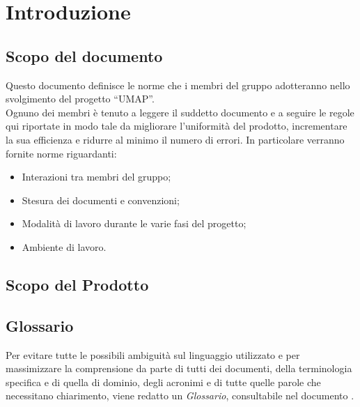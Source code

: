 \section{Introduzione}

\subsection{Scopo del documento}

Questo documento definisce le norme che i membri del gruppo \GroupName{} adotteranno nello svolgimento del progetto “UMAP”. \\

Ognuno dei membri è tenuto a leggere il suddetto documento e a seguire le regole qui riportate in modo tale da migliorare l'uniformità del prodotto, incrementare la sua efficienza e ridurre al minimo il numero di errori. In particolare verranno fornite norme riguardanti:
\begin{itemize}
\item Interazioni tra membri del gruppo;
\item Stesura dei documenti e convenzioni;
\item Modalità di lavoro durante le varie fasi del progetto;
\item Ambiente di lavoro.
\end{itemize}

\subsection{Scopo del Prodotto}
\ScopoDelProdotto

\subsection{Glossario}
Per evitare tutte le possibili ambiguità sul linguaggio utilizzato e per massimizzare la comprensione da parte di tutti dei documenti, della terminologia specifica e di quella di dominio, degli acronimi e di tutte quelle parole che necessitano chiarimento, viene redatto un \textit{Glossario}, consultabile nel documento \Glossario.






